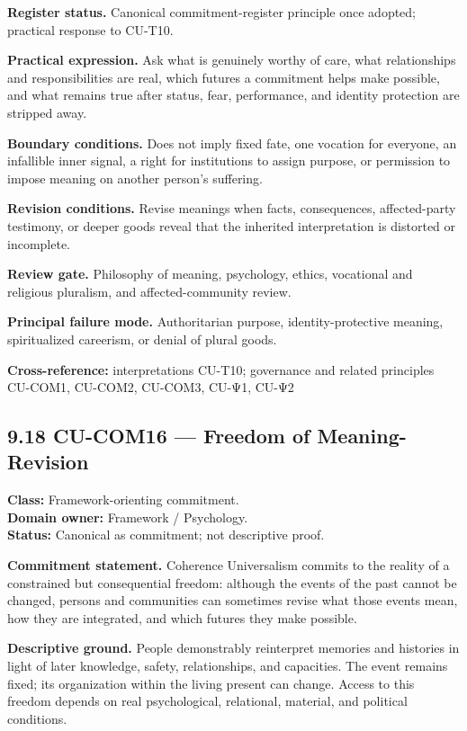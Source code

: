 \documentclass[
  11pt,
]{article}
\begin{document}
\textbf{Register status.} Canonical commitment-register principle once
adopted; practical response to CU-T10.

\textbf{Practical expression.} Ask what is genuinely worthy of care,
what relationships and responsibilities are real, which futures a
commitment helps make possible, and what remains true after status,
fear, performance, and identity protection are stripped away.

\textbf{Boundary conditions.} Does not imply fixed fate, one vocation
for everyone, an infallible inner signal, a right for institutions to
assign purpose, or permission to impose meaning on another person's
suffering.

\textbf{Revision conditions.} Revise meanings when facts, consequences,
affected-party testimony, or deeper goods reveal that the inherited
interpretation is distorted or incomplete.

\textbf{Review gate.} Philosophy of meaning, psychology, ethics,
vocational and religious pluralism, and affected-community review.

\textbf{Principal failure mode.} Authoritarian purpose,
identity-protective meaning, spiritualized careerism, or denial of
plural goods.

\textbf{Cross-reference:} interpretations CU-T10; governance and related
principles CU-COM1, CU-COM2, CU-COM3, CU-Ψ1, CU-Ψ2

\subsection{9.18 CU-COM16 --- Freedom of
Meaning-Revision}\label{cu-com16-freedom-of-meaning-revision}

\textbf{Class:} Framework-orienting commitment.\\
\textbf{Domain owner:} Framework / Psychology.\\
\textbf{Status:} Canonical as commitment; not descriptive proof.

\textbf{Commitment statement.} Coherence Universalism commits to the
reality of a constrained but consequential freedom: although the events
of the past cannot be changed, persons and communities can sometimes
revise what those events mean, how they are integrated, and which
futures they make possible.

\textbf{Descriptive ground.} People demonstrably reinterpret memories
and histories in light of later knowledge, safety, relationships, and
capacities. The event remains fixed; its organization within the living
present can change. Access to this freedom depends on real
psychological, relational, material, and political conditions.
\end{document}
